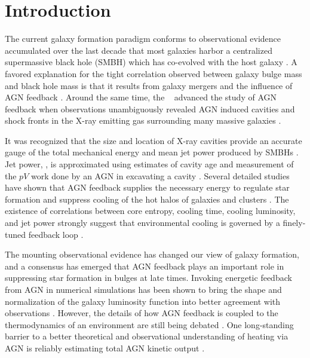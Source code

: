 \documentclass{emulateapj}
\begin{document}


\section{Introduction}
\label{sec:intro}

The current galaxy formation paradigm conforms to observational
evidence accumulated over the last decade that most galaxies harbor a
centralized supermassive black hole (SMBH) which has co-evolved with
the host galaxy \citep{1995ARA&A..33..581K, magorrian,
  2000ApJ...539L...9F, 2000ApJ...539L..13G, marconihunt03,
  2005MNRAS.362...25B}. A favored explanation for the tight
correlation observed between galaxy bulge mass and black hole mass is
that it results from galaxy mergers and the influence of AGN feedback
\citep[\eg][]{1998A&A...331L...1S, 2000MNRAS.311..576K}. Around the
same time, the \cxo\ \citep{chandra} advanced the study of AGN
feedback when observations unambiguously revealed AGN induced cavities
and shock fronts in the X-ray emitting gas surrounding many massive
galaxies \citep[\eg][]{2000ApJ...534L.135M, perseus1, schindler01}.

It was recognized that the size and location of X-ray cavities provide
an accurate gauge of the total mechanical energy and mean jet power
produced by SMBHs \citep{2000ApJ...534L.135M}. Jet power, \pjet, is
approximated using estimates of cavity age and measurement of the $pV$
work done by an AGN in excavating a cavity \citep[see][for a
  review]{mcnamrev}. Several detailed studies have shown that AGN
feedback supplies the necessary energy to regulate star formation and
suppress cooling of the hot halos of galaxies and clusters
\citep{birzan04, 2005MNRAS.364.1343D, rafferty06, dunn08,
  birzan08}. The existence of correlations between core entropy,
cooling time, cooling luminosity, and jet power strongly suggest that
environmental cooling is governed by a finely-tuned feedback loop
\citep{haradent, 2008ApJ...687..899R, accept}.

The mounting observational evidence has changed our view of galaxy
formation, and a consensus has emerged that AGN feedback plays an
important role in suppressing star formation in bulges at late
times. Invoking energetic feedback from AGN in numerical simulations
has been shown to bring the shape and normalization of the galaxy
luminosity function into better agreement with observations
\citep{croton06, bower06, saro06, sijacki07}. However, the details of
how AGN feedback is coupled to the thermodynamics of an environment
are still being debated \citep{2008ASPC..386..343D,
  2009arXiv0910.3691M}. One long-standing barrier to a better
theoretical and observational understanding of heating via AGN is
reliably estimating total AGN kinetic output
\citep[\eg][]{1991Natur.349..138R, 1996AJ....112....9L}.
\end{document}
